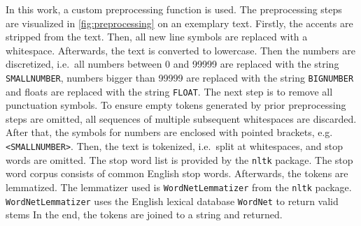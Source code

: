 In this work, a custom preprocessing function is used.
The preprocessing steps are visualized in \autoref{fig:preprocessing} on an exemplary text.
Firstly, the accents are stripped from the text.
Then, all new line symbols are replaced with a whitespace.
Afterwards, the text is converted to lowercase.
Then the numbers are discretized, i.e.\ all numbers between 0 and 99999 are replaced with the string \texttt{SMALLNUMBER}, 
numbers bigger than 99999 are replaced with the string \texttt{BIGNUMBER} and floats are replaced with the string \texttt{FLOAT}.
The next step is to remove all punctuation symbols.
To ensure empty tokens generated by prior preprocessing steps are omitted, 
all sequences of multiple subsequent whitespaces are discarded.
After that, the symbols for numbers are enclosed with pointed brackets, e.g. \texttt{<SMALLNUMBER>}.
Then, the text is tokenized, i.e.\ split at whitespaces, and stop words are omitted.
The stop word list is provided by the \texttt{nltk} package.
The stop word corpus consists of common English stop words.
Afterwards, the tokens are lemmatized.
The lemmatizer used is \texttt{WordNetLemmatizer} from the \texttt{nltk} package.
\texttt{WordNetLemmatizer} uses the English lexical database \texttt{WordNet} to return valid stems \cite{nltk-lemma-wordnet}
In the end, the tokens are joined to a string and returned.